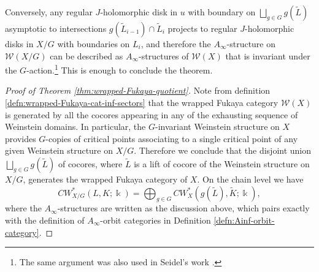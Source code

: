 Conversely, any regular $J$-holomorphic disk in $u$ with boundary on $\displaystyle\bigsqcup_{g\in G}g(\tilde{L})$ asymptotic to intersections $g(\tilde{L}_{i-1})\cap\tilde{L}_i$ projects to regular $J$-holomorphic disks in $X/G$ with boundaries on $L_i$, and therefore the $A_{\infty}$-structure on $\mathcal{W} (X/G)$ can be described as $A_{\infty}$-structures of $\mathcal{W} (X)$ that is invariant under the $G$-action.\footnote{The same argument was also used in Seidel's work \cite{Seidel11}.} This is enough to conclude the theorem.
\begin{proof}[Proof of Theorem \ref{thm:wrapped-Fukaya-quotient}]
    Note from definition \ref{defn:wrapped-Fukaya-cat-inf-sectors} that the wrapped Fukaya category $\mathcal{W} (X)$ is generated by all the cocores appearing in any of the exhausting sequence of Weinstein domains. In particular, the $G$-invariant Weinstein structure on $X$ provides $G$-copies of critical points associating to a single critical point of any given Weinstein structure on $X/G$. Therefore we conclude that the disjoint union $\displaystyle\bigsqcup_{g\in G} g(\tilde{L})$ of cocores, where $\tilde{L}$ is a lift of cocore of the Weinstein structure on $X/G$, generates the wrapped Fukaya category of $X$. On the chain level we have \[
        CW^{\ast}_{X/G}\left(L,K;\Bbbk\right)=\bigoplus_{g\in G} CW^{\ast}_X (g(\tilde{L}),\tilde{K};\Bbbk),
    \]where the $A_{\infty}$-structures are written as the discussion above, which pairs exactly with the definition of $A_{\infty}$-orbit categories in Definition \ref{defn:Ainf-orbit-category}.
\end{proof}
